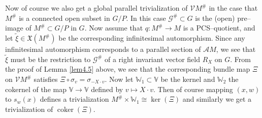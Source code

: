 \documentclass[12pt,a4paper]{amsart}
\def\frak{\mathfrak}
\def\Bbb{\mathbb}
\def\Cal{\mathcal}
\newcommand{\x}{\times}
\renewcommand{\o}{\circ}
\newcommand{\si}{\sigma}
\newcommand{\Coker}{\operatorname{coker}}
\numberwithin{theorem}{section}
\theoremstyle{definition}
\theoremstyle{remark}
\begin{document}
Now of course we also get a global parallel trivialization of $\Cal
VM^\#$ in the case that $M^\#$ is a connected open subset in $G/P$. In
this case $\Cal G^\#\subset G$ is the (open) pre--image of
$M^\#\subset G/P$ in $G$. Now assume that $q:M^\#\to M$ is a
PCS--quotient, and let $\tilde\xi\in\frak X(M^\#)$ be the
corresponding infinitesimal automorphism. Since any infinitesimal
automorphism corresponds to a parallel section of $\Cal AM$, we see
that $\tilde\xi$ must be the restriction to $\Cal G^\#$ of a right
invariant vector field $R_X$ on $G$. From the proof of Lemma \ref{lem4.5}
above, we see that the corresponding bundle map $\Xi$ on $\Cal VM^\#$
satisfies $\Xi\o \si_v=\si_{-X\cdot v}$. Now let $\Bbb W_1\subset\Bbb
V$ be the kernel and $\Bbb W_2$ the cokernel of the map $\Bbb V\to\Bbb
V$ defined by $v\mapsto X\cdot v$. Then of course mapping $(x,w)$ to
$s_w(x)$ defines a trivialization $M^\#\x\Bbb W_1\cong\ker(\Xi)$ and
similarly we get a trivialization of $\Coker(\Xi)$.
\end{document}
